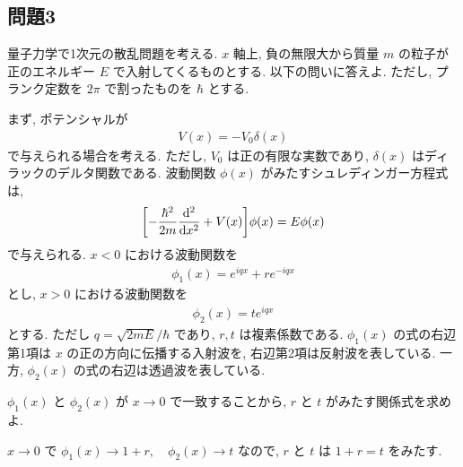 \documentclass[../../ou-physics-exam.tex]{subfiles}
\begin{document}
\subsection*{問題3}
量子力学で1次元の散乱問題を考える. 
$ x $ 軸上, 負の無限大から質量 $ m $ の粒子が正のエネルギー $ E $ で入射してくるものとする. 
以下の問いに答えよ. 
ただし, プランク定数を $ 2 \pi $ で割ったものを $ \hbar $ とする.

まず, ポテンシャルが
\begin{align*}
    V (x) = - V_0 \delta (x)
\end{align*}
で与えられる場合を考える. 
ただし, $ V_0 $ は正の有限な実数であり, $ \delta (x) $ はディラックのデルタ関数である. 
波動関数 $ \phi (x) $ がみたすシュレディンガー方程式は,
\begin{align*}
    \qty[ - \frac{\hbar^2}{2m} \dv[2]{x} + V(x) ] \phi (x) = E \phi (x)
\end{align*}
で与えられる. 
$ x < 0 $ における波動関数を
\begin{align*}
    \phi_1 (x) = e^{iqx} + r e^{-iqx}
\end{align*}
とし, $ x > 0 $ における波動関数を
\begin{align*}
    \phi_2 (x) = t e^{iqx}
\end{align*}
とする. 
ただし $ q = \sqrt{2mE}/\hbar $ であり, $ r, t $ は複素係数である. 
$ \phi_1 (x) $ の式の右辺第1項は $ x $ の正の方向に伝播する入射波を, 右辺第2項は反射波を表している. 
一方, $ \phi_2 (x) $ の式の右辺は透過波を表している.

$ \phi_1 (x) $ と $ \phi_2 (x) $ が $ x \to 0 $ で一致することから, $ r $ と $ t $ がみたす関係式を求めよ.
\begin{answer}
    $ x \to 0 $ で $ \phi_1 (x) \to 1 + r, \quad \phi_2 (x) \to t $ なので, $ r $ と $ t $ は $ 1 + r = t $ をみたす.
\end{answer}
\end{document}
